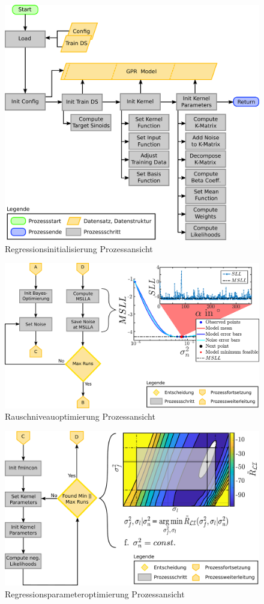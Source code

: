 \clearpage


\begin{figure}[htbp]
	\centering
	\includegraphics[width=0.7\linewidth]{chapters/images/3-SW-E-OExp/GPR_Initialization}
	\caption[Regressionsinitialisierung Prozessansicht]{Regressionsinitialisierung Prozessansicht}
	\label{fig:gprinitialization}
\end{figure}


\clearpage


\begin{figure}[tbph]
	\centering
	\includegraphics[width=0.85\linewidth]{chapters/images/3-SW-E-OExp/Noise_Optimization}
	\caption[Rauschniveauoptimierung Prozessansicht]{Rauschniveauoptimierung Prozessansicht}
	\label{fig:noiseoptimization}
\end{figure}


\clearpage


\begin{figure}[tbph]
	\centering
	\includegraphics[width=0.8\linewidth]{chapters/images/3-SW-E-OExp/Kernel_Tuning}
	\caption[Regressionsparameteroptimierung Prozessansicht]{Regressionsparameteroptimierung Prozessansicht}
	\label{fig:kerneltuning}
\end{figure}


